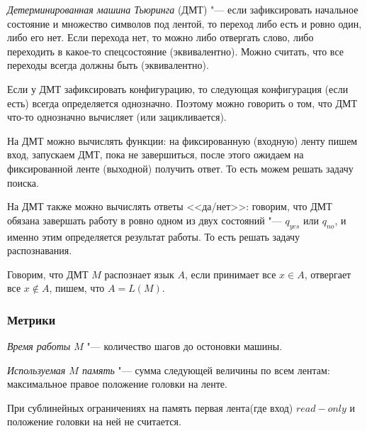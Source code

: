 \begin{Def}
	\textit{Детерминированная машина Тьюринга} (ДМТ) "--- если зафиксировать начальное состояние и множество символов под лентой, то переход либо есть и ровно один, либо его нет.
	Если перехода нет, то можно либо отвергать слово, либо переходить в какое-то спецсостояние (эквивалентно).
	Можно считать, что все переходы всегда должны быть (эквивалентно).
\end{Def}
	
\begin{Rem}
	Если у ДМТ зафиксировать конфигурацию, то следующая конфигурация (если есть) всегда определяется однозначно.
	Поэтому можно говорить о том, что ДМТ что-то однозначно вычисляет (или зацикливается).
\end{Rem}
	
\begin{Def}
	На ДМТ можно вычислять функции: на фиксированную (входную) ленту пишем вход, запускаем ДМТ, пока не завершиться, после этого ожидаем на фиксированной ленте (выходной) получить ответ.
 	То есть можем решать задачу поиска. 
\end{Def}
	
\begin{Def}
	На ДМТ также можно вычислять ответы <<да/нет>>: говорим, что ДМТ обязана завершать работу в ровно одном из двух состояний "--- $q_{yes}$ или $q_{no}$, и именно этим определяется результат работы.
	То есть решать задачу распознавания.
\end{Def}

\begin{Def}
	Говорим, что ДМТ $M$ распознает язык $A$, если принимает все $x \in A$, отвергает все $x \not \in A$, пишем, что $A = L(M)$.
\end{Def}

\subsubsection{Метрики}

\begin{Def}
	\textit{Время работы $M$} "--- количество шагов до остоновки машины.
\end{Def}

\begin{Def}
	\textit{Используемая $M$ память} "--- сумма следующей величины по всем лентам: максимальное правое положение головки на ленте.
\end{Def}

\begin{Rem}
	При сублинейных ограничениях на память первая лента(где вход) $read-only$ и положение головки на ней не считается. 
\end{Rem}


